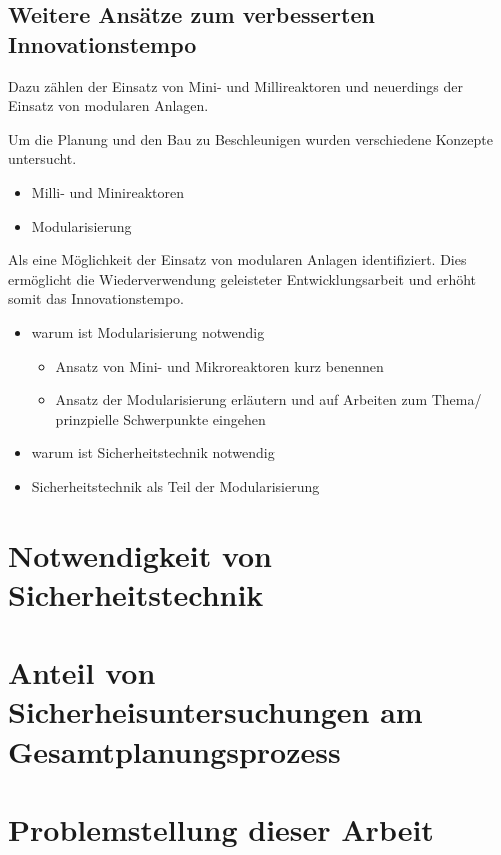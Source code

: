 \subsection{Weitere Ans\"atze zum verbesserten Innovationstempo}
Dazu z\"ahlen der Einsatz von Mini- und Millireaktoren und neuerdings der Einsatz von modularen Anlagen.  

\hfill \newline
Um die Planung und den Bau zu Beschleunigen wurden verschiedene Konzepte untersucht. 
\begin{itemize}
\item Milli- und Minireaktoren
\item Modularisierung
\end{itemize}
Als eine M\"oglichkeit der Einsatz von modularen Anlagen identifiziert. Dies erm\"oglicht die Wiederverwendung geleisteter Entwicklungsarbeit und erh\"oht somit das Innovationstempo.    


\begin{itemize}
\item warum ist Modularisierung notwendig
  \begin{itemize}
  \item Ansatz von Mini- und Mikroreaktoren kurz benennen
  \item Ansatz der Modularisierung erl\"autern und auf Arbeiten zum Thema/ prinzpielle Schwerpunkte eingehen
  
  \end{itemize}
\item warum ist Sicherheitstechnik notwendig
\item Sicherheitstechnik als Teil der Modularisierung 
\end{itemize}
\section{Notwendigkeit von Sicherheitstechnik}
\section{Anteil von Sicherheisuntersuchungen am Gesamtplanungsprozess}

\section{Problemstellung dieser Arbeit}
